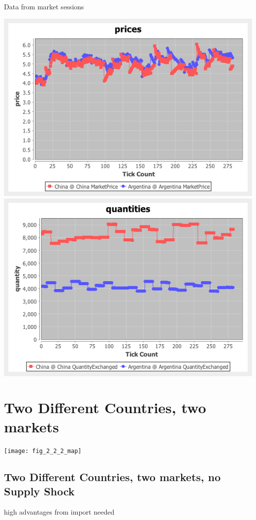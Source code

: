 \documentclass{article}
\begin{document}
\noindent Data from market sessions

\vskip2mm
\hskip-2cm
\includegraphics[scale=0.4]{fig_case7_prices}
\includegraphics[scale=0.4]{fig_case7_quantities}

\newpage

\section{Two Different Countries, two markets}

\texttt{[image: fig\_2\_2\_2\_map]}

\newpage
\subsection{Two Different Countries, two markets, no Supply Shock}
high advantages from import needed
\end{document}
